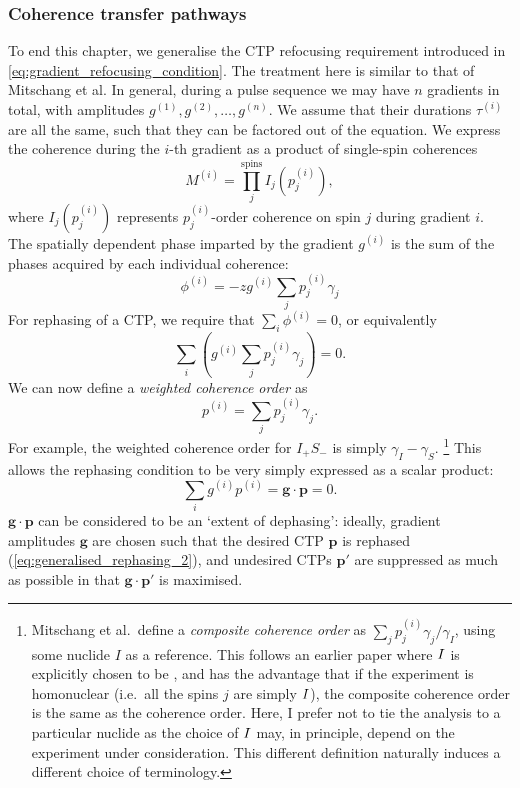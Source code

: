 \subsubsection{Coherence transfer pathways}

To end this chapter, we generalise the CTP refocusing requirement introduced in \cref{eq:gradient_refocusing_condition}.
The treatment here is similar to that of Mitschang et al.\autocite{Mitschang1995JCP}
In general, during a pulse sequence we may have $n$ gradients in total, with amplitudes $g^{(1)}, g^{(2)}, \ldots, g^{(n)}$.
We assume that their durations $\tau^{(i)}$ are all the same, such that they can be factored out of the equation.
We express the coherence during the $i$-th gradient as a product of single-spin coherences
\begin{equation}
    \label{eq:generalised_coherence}
    M^{(i)} = \prod_j^{\text{spins}} I_j(p_j^{(i)}),
\end{equation}
where $I_j(p_j^{(i)})$ represents $p_j^{(i)}$-order coherence on spin $j$ during gradient $i$.
The spatially dependent phase imparted by the gradient $g^{(i)}$ is the sum of the phases acquired by each individual coherence:
\begin{equation}
    \label{eq:generalised_phase}
    \phi^{(i)} = -zg^{(i)} \sum_j p_j^{(i)}\gamma_j
\end{equation}
For rephasing of a CTP, we require that $\sum_i \phi^{(i)} = 0$, or equivalently
\begin{equation}
    \label{eq:generalised_rephasing_1}
    \sum_i \left( g^{(i)}\sum_j p_j^{(i)}\gamma_j\right) = 0.
\end{equation}
We can now define a \textit{weighted coherence order}\autocite{John1991JMR} as
\begin{equation}
    \label{eq:weighted_coherence_order}
    p^{(i)} = \sum_j p_j^{(i)}\gamma_j.
\end{equation}
For example, the weighted coherence order for $I_+S_-$ is simply $\gamma_I - \gamma_S$.%
\footnote{Mitschang et al.\ define a \textit{composite coherence order} as $\sum_j p_j^{(i)}\gamma_j/\gamma_I$, using some nuclide $I$ as a reference. This follows an earlier paper\autocite{John1991JMR} where $I\/$ is explicitly chosen to be \proton{}, and has the advantage that if the experiment is homonuclear (i.e.\ all the spins $j$ are simply $I\/$), the composite coherence order is the same as the coherence order. Here, I prefer not to tie the analysis to a particular nuclide as the choice of $I\/$ may, in principle, depend on the experiment under consideration. This different definition naturally induces a different choice of terminology.}
This allows the rephasing condition to be very simply expressed as a scalar product:
\begin{equation}
    \label{eq:generalised_rephasing_2}
    \sum_i g^{(i)} p^{(i)} = \symbf{g} \cdot \symbf{p} = 0.
\end{equation}
$\symbf{g} \cdot \symbf{p}$ can be considered to be an `extent of dephasing': ideally, gradient amplitudes $\symbf{g}$ are chosen such that the desired CTP $\symbf{p}$ is rephased (\cref{eq:generalised_rephasing_2}), and undesired CTPs $\symbf{p'}$ are suppressed as much as possible in that $\symbf{g} \cdot \symbf{p'}$ is maximised.
